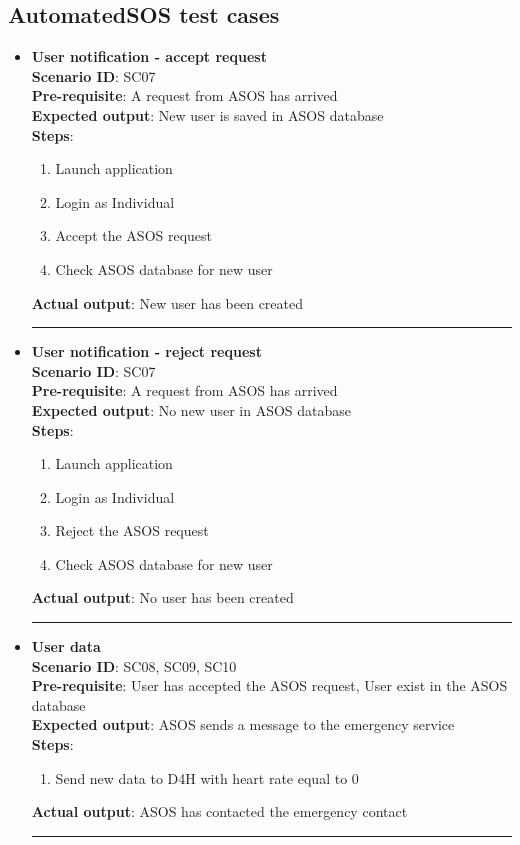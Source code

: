 \documentclass[a4paper, hidelinks, 12pt]{report}
\begin{document}
\subsection{AutomatedSOS test cases}
\begin{itemize}
		\item{\textbf{User notification - accept request}} \\
		\textbf{Scenario ID}: SC07 \\
		\textbf{Pre-requisite}: A request from ASOS has arrived \\
		\textbf{Expected output}: New user is saved in ASOS database\\
		\textbf{Steps}:
		\begin{enumerate}
			\item{Launch application}
			\item{Login as Individual}
			\item{Accept the ASOS request}
			\item{Check ASOS database for new user}
		\end{enumerate}
		\textbf{Actual output}: New user has been created \\
		\rule{\linewidth}{0.4pt}
		
		\item{\textbf{User notification - reject request}} \\
		\textbf{Scenario ID}: SC07 \\
		\textbf{Pre-requisite}: A request from ASOS has arrived \\
		\textbf{Expected output}: No new user in ASOS database\\
		\textbf{Steps}:
		\begin{enumerate}
			\item{Launch application}
			\item{Login as Individual}
			\item{Reject the ASOS request}
			\item{Check ASOS database for new user}
		\end{enumerate}
		\textbf{Actual output}: No user has been created \\
		\rule{\linewidth}{0.4pt}
		
		\item{\textbf{User data}} \\
		\textbf{Scenario ID}: SC08, SC09, SC10 \\
		\textbf{Pre-requisite}: User has accepted the ASOS request, User exist in the ASOS database \\
		\textbf{Expected output}: ASOS sends a message to the emergency service\\
		\textbf{Steps}:
		\begin{enumerate}
			\item{Send new data to D4H with heart rate equal to 0}
		\end{enumerate}
		\textbf{Actual output}: ASOS has contacted the emergency contact \\
		\rule{\linewidth}{0.4pt}
		
\end{itemize}
\end{document}
